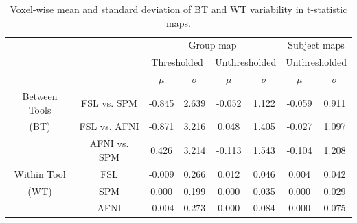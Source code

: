 \documentclass[11pt,onecolumn]{article}
\begin{document}
\setlength{\tabcolsep}{5pt}
\begin{table}[h]
  \centering
  \begin{tabular}{cccccc|cc}
    \toprule
                      &              & \multicolumn{4}{c|}{Group map}  & \multicolumn{2}{c}{Subject maps}                                                                     \\
    \multirow{2}{*}{} & {}           & \multicolumn{2}{c}{Thresholded} & \multicolumn{2}{c|}{Unthresholded} & \multicolumn{2}{c}{Unthresholded}                               \\
    {}                & {}           & $\mu$                           & $\sigma$                           & $\mu$                             & $\sigma$ & $\mu$ & $\sigma$ \\
    \midrule
    \rowcolor{lightgray!50}
    {Between Tools}   & FSL vs. SPM  & -0.845                           & 2.639                              & -0.052                             & 1.122    & -0.059 & 0.911    \\
    \rowcolor{lightgray!50}
    {(BT)}            & FSL vs. AFNI & -0.871                           & 3.216                              & 0.048                             & 1.405    & -0.027 & 1.097    \\
    \rowcolor{lightgray!50}
    {}                & AFNI vs. SPM & 0.426                           & 3.214                              & -0.113                             & 1.543    & -0.104 & 1.208    \\
    {Within Tool}     & FSL          & -0.009                           & 0.266                              & 0.012                             & 0.046    & 0.004 & 0.042    \\
    {(WT)}            & SPM          & 0.000                           & 0.199                              & 0.000                             & 0.035    & 0.000 & 0.029    \\
    {}                & AFNI         & -0.004                           & 0.273                              & 0.000                             & 0.084    & 0.000 & 0.075    \\
    \bottomrule
  \end{tabular}
  \caption{Voxel-wise mean and standard deviation of BT and WT variability in t-statistic maps.}
  \label{table:pipeline-stats}
\end{table}
\end{document}
